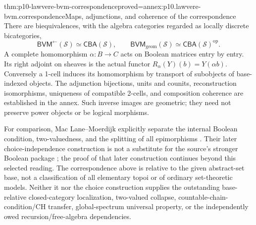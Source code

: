 \begin{hbtheorem}{thm:p10-lawvere-bvm-correspondence}{proved=annex:p10.lawvere-bvm.correspondence}{Maps, adjunctions, and coherence of the correspondence}
There are biequivalences, with the algebra categories regarded as locally
discrete bicategories,
\[
 \mathsf{BVM}^{\leftarrow}(\mathcal S)
       \simeq\mathsf{CBA}(\mathcal S),\qquad
 \mathsf{BVM}_{\mathrm{geom}}(\mathcal S)
       \simeq\mathsf{CBA}(\mathcal S)^{\mathrm{op}}.
\]
A complete homomorphism \(\alpha:B\to C\) acts on Boolean matrices
entry by entry. Its right adjoint on sheaves is the actual functor
\(R_\alpha(Y)(b)=Y(\alpha b)\). Conversely a 1-cell induces its
homomorphism by transport of subobjects of base-indexed objects.
The adjunction bijections, units and counits, reconstruction isomorphisms,
uniqueness of compatible 2-cells, and composition coherence are established
in the annex. Such inverse images are geometric; they need not preserve
power objects or be logical morphisms.
\end{hbtheorem}

For comparison, Mac Lane--Moerdijk explicitly separate the internal
Boolean condition, two-valuedness, and the splitting of all epimorphisms
\cite[pp.~270--276]{MacLaneMoerdijk1992}. Their later choice-independence
construction is not a substitute for the source's stronger Boolean
package \cite[pp.~291--295]{MacLaneMoerdijk1992}; the proof of that later
construction continues beyond this selected reading. The correspondence
above is relative to the given abstract-set base, not a classification
of all elementary topoi or of ordinary set-theoretic models.
Neither it nor the choice construction supplies the outstanding
base-relative closed-category localization, two-valued collapse,
countable-chain-condition/CH transfer, global-spectrum universal property,
or the independently owed recursion/free-algebra dependencies.
